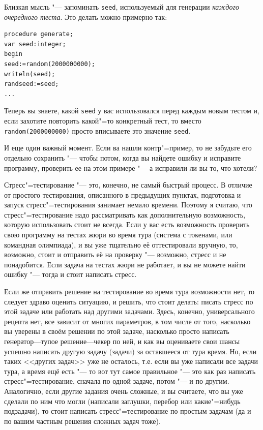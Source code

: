 \documentclass[a4paper,10pt]{problems}
\begin{document}
Близкая мысль "--- запоминать \verb`seed`, используемый для генерации \textit{каждого очередного теста}. Это делать можно примерно так:
\begin{verbatim}
procedure generate;
var seed:integer;
begin
seed:=random(2000000000);
writeln(seed);
randseed:=seed;
...
\end{verbatim}
Теперь вы знаете, какой \verb`seed` у вас использовался перед каждым новым тестом и, если захотите повторить какой"=то конкретный тест, то 
вместо \verb`random(2000000000)` просто вписываете это значение \verb`seed`.

И еще один важный момент. Если ва нашли контр"=пример, то не забудьте его отдельно сохранить "--- чтобы потом, когда вы найдете ошибку и исправите
программу, проверить ее на этом примере "--- а исправили ли вы то, что хотели?

Стресс"=тестирование "--- это, конечно, не самый быстрый процесс. 
В отличие от простого тестирования, описанного в предыдущих пунктах, подготовка и запуск стресс"=тестирования занимает немало времени.
Поэтому я считаю, что стресс"=тестирование надо рассматривать как дополнительную возможность, которую использовать стоит не всегда.
Если у вас есть возможность проверить свою программу на тестах жюри во время тура (система с токенами, или командная олимпиада), 
и вы уже тщательно её оттестировали вручную, то, возможно, стоит и отправить её на проверку "--- возможно, стресс и не понадобится.
Если задача на тестах жюри не работает, и вы не можете найти ошибку "--- тогда и стоит написать стресс.

Если же отправить решение на тестирование во время тура возможности нет, то следует здраво оценить ситуацию, и решить, что стоит делать:
писать стресс по этой задаче или работать над другими задачами. 
Здесь, конечно, универсального рецепта нет, все зависит от многих параметров, 
в том числе от того, насколько вы уверены в своём решении по этой задаче, насколько просто написать генератор---тупое решение---чекер по ней,
и как вы оцениваете свои шансы успешно написать другую задачу (задачи) за оставшееся от тура время. 
Но, если таких <<других задач>> уже не осталось, т.е. если вы уже написали все задачи тура, а время ещё есть "--- то вот тут самое правильное "---
это как раз написать стресс"=тестирование, сначала по одной задаче, потом "--- и по другим. 
Аналогично, если другие задания очень сложные, и вы считаете, что вы уже сделали по ним что могли (написали заглушки, перебор или какие"=нибудь подзадачи),
то стоит написать стресс"=тестирование по простым задачам (да и по вашим частным решения сложных задач тоже).
\end{document}
